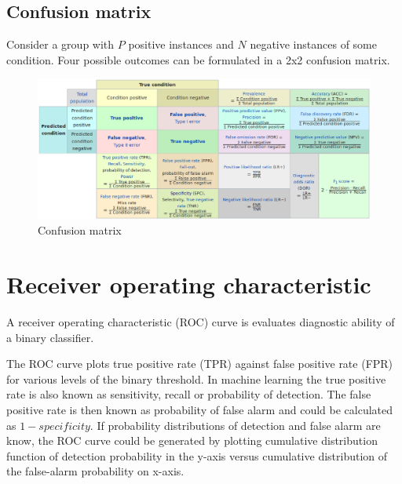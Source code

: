 \documentclass[a4paper]{article}
\begin{document}
\subsection{Confusion matrix}

Consider a group with $P$ positive instances and $N$ negative instances of some condition. Four possible outcomes can be formulated in a 2x2 confusion matrix.
\begin{figure}[htp]
\centering
\includegraphics[scale = 0.35]{pictures/confusion_matrix.eps}
\caption{Confusion matrix}
\label{fig_conf_mtrx}
\end{figure}	

\section{Receiver operating characteristic}

A receiver operating characteristic (ROC) curve is evaluates diagnostic ability of a binary classifier.

The ROC curve plots true positive rate (TPR) against false positive rate (FPR) for various levels of the binary threshold. In machine learning the true positive rate is also known as sensitivity, recall or probability of detection. The false positive rate is then known as probability of false alarm and could be calculated as $1 - \textit{specificity}$. If probability distributions of detection and false alarm are know, the ROC curve could be generated by plotting cumulative distribution function of detection probability in the y-axis versus cumulative distribution of the false-alarm probability on x-axis.
\end{document}
